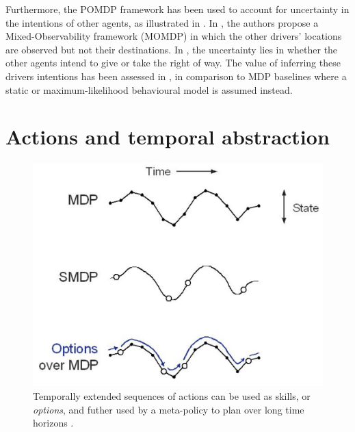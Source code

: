 Furthermore, the \gls{POMDP} framework has been used to account for uncertainty in the intentions of other agents, as illustrated in . In \citep{Bandyopadhyay2013}, the authors propose a Mixed-Observability framework (MOMDP) in which the other drivers' locations are observed but not their destinations. In \citep{Barbier2018}, the uncertainty lies in whether the other agents intend to give or take the right of way. The value of inferring these drivers intentions has been assessed in \citep{Sunberg2017}, in comparison to MDP baselines where a static or maximum-likelihood behavioural model is assumed instead.



\section{Actions and temporal abstraction}
\label{sec:temporal-abstraction}

\begin{figure}[th]
	\centering
	\includegraphics[width=0.5\linewidth]{img/smdp}
	\caption{Temporally extended sequences of actions can be used as skills, or \emph{options}, and futher used by a meta-policy to plan over long time horizons \citep{Sutton1999}.}
	\label{fig:smdp}
\end{figure}

